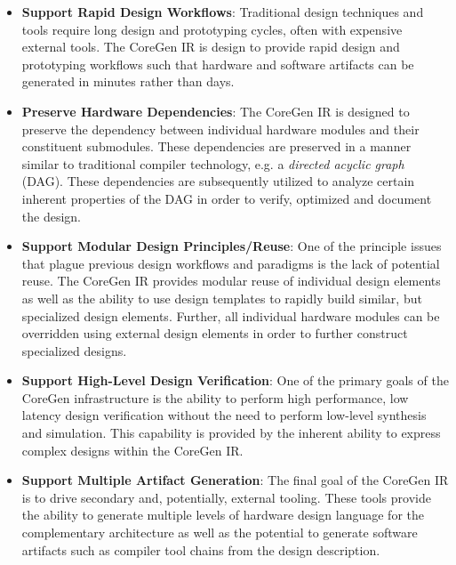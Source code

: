 \documentclass{article}
\begin{document}
\begin{itemize}
\item \textbf{Support Rapid Design Workflows}: Traditional design techniques and tools require long 
design and prototyping cycles, often with expensive external tools.  The CoreGen IR is design to provide 
rapid design and prototyping workflows such that hardware and software artifacts can be generated in minutes 
rather than days.

\item \textbf{Preserve Hardware Dependencies}: The CoreGen IR is designed to preserve the dependency 
between individual hardware modules and their constituent submodules.  These dependencies are preserved 
in a manner similar to traditional compiler technology, e.g. a \textit{directed acyclic graph} (DAG).  These 
dependencies are subsequently utilized to analyze certain inherent properties of the DAG in order to 
verify, optimized and document the design.  

\item \textbf{Support Modular Design Principles/Reuse}: One of the principle issues that plague previous 
design workflows and paradigms is the lack of potential reuse.  The CoreGen IR provides modular reuse 
of individual design elements as well as the ability to use design templates to rapidly build similar, but 
specialized design elements.  Further, all individual hardware modules can be overridden using external 
design elements in order to further construct specialized designs.  

\item \textbf{Support High-Level Design Verification}: One of the primary goals of the CoreGen infrastructure 
is the ability to perform high performance, low latency design verification without the need to perform low-level 
synthesis and simulation.  This capability is provided by the inherent ability to express complex designs 
within the CoreGen IR.  

\item \textbf{Support Multiple Artifact Generation}: The final goal of the CoreGen IR is to drive secondary 
and, potentially, external tooling.  These tools provide the ability to generate multiple levels of hardware 
design language for the complementary architecture as well as the potential to generate software 
artifacts such as compiler tool chains from the design description.
\end{itemize}
\end{document}
